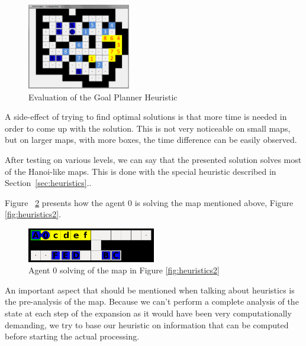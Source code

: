 \begin{figure}[htb]
\begin{center}
\includegraphics[width=0.4\textwidth]{figures/example_goal_planner}
\caption{Evaluation of the Goal Planner Heuristic}
\label{fig:goalplanneraresults}
\end{center}
\end{figure}

A side-effect of trying to find optimal solutions is that more time is needed in order to come up with the
solution. This is not very noticeable on small maps, but on larger maps, with more boxes, the time difference
can be easily observed.

After testing on various levels, we can say that the presented solution solves most of the Hanoi-like maps.
This is done with the special heuristic described in Section~\ref{sec:heuristics}..

Figure ~\ref{fig:results_hanoi} presents how the agent 0 is solving the map mentioned above, Figure
\ref{fig:heuristics2}.

\begin{figure}[htb]
\begin{center}
\includegraphics[width=0.5\textwidth]{figures/results_hanoi.png}
\caption{Agent 0 solving of the map in Figure \ref{fig:heuristics2}}
\label{fig:results_hanoi}
\end{center}
\end{figure}

An important aspect that should be mentioned when talking about heuristics is the pre-analysis of the map.
Because we can’t perform a complete analysis of the state at each step of the expansion as it would have been
very computationally demanding, we try to base our heuristic on information that can be computed before
starting the actual processing.

